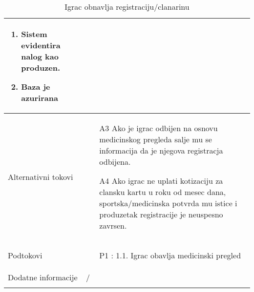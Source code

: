 \documentclass{article}
\begin{document}
\begin{longtable}{| p{} | p{} |}
\begin{enumerate}
\begin{itemize}
        \end{itemize}
        \item Sistem evidentira nalog kao produzen.
        \item Baza je azurirana
    \end{enumerate}\\
\hline
    Alternativni tokovi & \begin{itemize}
        \item[A3] Ako je igrac odbijen na osnovu medicinskog pregleda salje mu se informacija da je njegova registracja odbijena.
        \item[A4] Ako igrac ne uplati kotizaciju za clansku kartu u roku od mesec dana, sportska/medicinska potvrda mu istice i produzetak registracije je neuspesno zavrsen.
    \end{itemize}\\
\hline
    Podtokovi & \begin{itemize}
        \item[P1]: 1.1. Igrac obavlja medicinski pregled
    \end{itemize}\\

\hline
    Dodatne informacije & / \\
\hline
\caption{Igrac obnavlja registraciju/clanarinu} %
\end{longtable}


\end{document}
